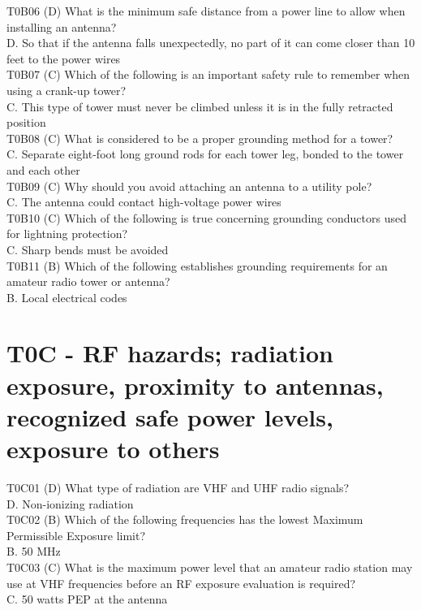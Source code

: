 \documentclass[12pt,letterpaper]{report}
\begin{document}
T0B06 (D) What is the minimum safe distance from a power line to allow when installing an antenna?\\
D. So that if the antenna falls unexpectedly, no part of it can come closer than 10 feet to the power wires\\

T0B07 (C) Which of the following is an important safety rule to remember when using a crank-up tower?\\
C. This type of tower must never be climbed unless it is in the fully retracted position\\

T0B08 (C) What is considered to be a proper grounding method for a tower?\\
C. Separate eight-foot long ground rods for each tower leg, bonded to the tower and each other\\

T0B09 (C) Why should you avoid attaching an antenna to a utility pole?\\
C. The antenna could contact high-voltage power wires\\

T0B10 (C) Which of the following is true concerning grounding conductors used for lightning protection?\\
C. Sharp bends must be avoided\\

T0B11 (B) Which of the following establishes grounding requirements for an amateur radio tower or antenna?\\
B. Local electrical codes\\

\section{T0C - RF hazards; radiation exposure, proximity to antennas, recognized safe power levels, exposure to others}

T0C01 (D) What type of radiation are VHF and UHF radio signals?\\
D. Non-ionizing radiation\\

T0C02 (B) Which of the following frequencies has the lowest Maximum Permissible Exposure limit?\\
B. 50 MHz\\

T0C03 (C) What is the maximum power level that an amateur radio station may use at VHF frequencies before an RF exposure evaluation is required?\\
C. 50 watts PEP at the antenna\\
\end{document}
